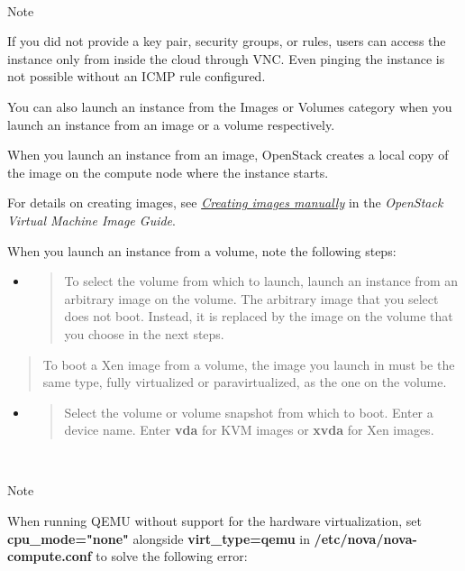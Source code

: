 ~

Note

If you did not provide a key pair, security groups, or rules, users can
access the instance only from inside the cloud through VNC. Even pinging
the instance is not possible without an ICMP rule configured.

You can also launch an instance from the Images or Volumes category when
you launch an instance from an image or a volume respectively.

When you launch an instance from an image, OpenStack creates a local
copy of the image on the compute node where the instance starts.

For details on creating images, see
\href{https://docs.openstack.org/image-guide/create-images-manually.html}{\emph{Creating
images manually}} in the \emph{OpenStack Virtual Machine Image Guide}.

When you launch an instance from a volume, note the following steps:

\begin{itemize}
\item
  \begin{quote}
  To select the volume from which to launch, launch an instance from an
  arbitrary image on the volume. The arbitrary image that you select
  does not boot. Instead, it is replaced by the image on the volume that
  you choose in the next steps.
  \end{quote}
\end{itemize}

\begin{quote}
To boot a Xen image from a volume, the image you launch in must be the
same type, fully virtualized or paravirtualized, as the one on the
volume.
\end{quote}

\begin{itemize}
\item
  \begin{quote}
  Select the volume or volume snapshot from which to boot. Enter a
  device name. Enter \textbf{vda} for KVM images or \textbf{xvda} for
  Xen images.
  \end{quote}
\end{itemize}

~

Note

When running QEMU without support for the hardware virtualization, set
\textbf{cpu\_mode="none"} alongside \textbf{virt\_type=qemu} in
\textbf{/etc/nova/nova-compute.conf} to solve the following error:

